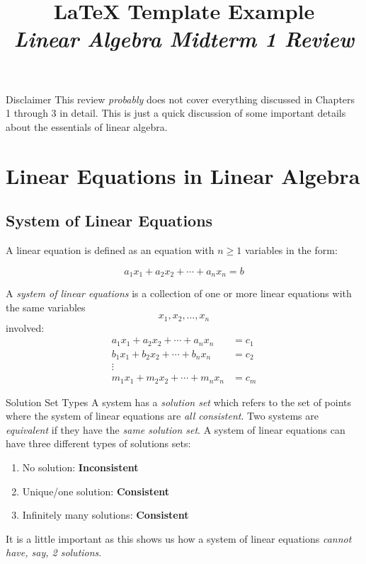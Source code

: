 \documentclass{article}
\title{LaTeX Template Example \\ \textit{Linear Algebra Midterm 1 Review}}
\begin{document}
\maketitle

\begin{boxcontainer}{Disclaimer}
	This review \emph{probably} does not cover everything discussed in Chapters 1 through 3 in detail. This is just a quick discussion of some important details about the essentials of linear algebra.
\end{boxcontainer}

\section{Linear Equations in Linear Algebra}

\subsection{System of Linear Equations}
A linear equation is defined as an equation with $n  \geq 1$ variables in the form:

\begin{equation}
	a_1x_1 + a_2x_2 + \cdots + a_nx_n = b
\end{equation}

A \emph{system of linear equations} is a collection of one or more linear equations with the same variables
$$
	x_1, x_2, \ldots, x_n
$$
involved:
\begin{equation}
	\begin{split}
		a_1x_1 + a_2x_2 + \cdots + a_nx_n & = c_1 \\
		b_1x_1 + b_2x_2 + \cdots + b_nx_n & = c_2 \\
		\vdots                            &       \\
		m_1x_1 + m_2x_2 + \cdots + m_nx_n & = c_m
	\end{split}
\end{equation}


\begin{boxcontainer}{Solution Set Types}
	A system has a \emph{solution set} which refers to the set of points where the system of linear equations are \emph{all consistent}. Two systems are \emph{equivalent} if they have the \emph{same solution set}. A system of linear equations can have three different types of solutions sets:
	\begin{enumerate}[label=\arabic*.]
		\item No solution: \textbf{Inconsistent}
		\item Unique/one solution: \textbf{Consistent}
		\item Infinitely many solutions: \textbf{Consistent}
	\end{enumerate}
	It is a little important as this shows us how a system of linear equations \emph{cannot have, say, 2 solutions}.
\end{boxcontainer}
\end{document}
